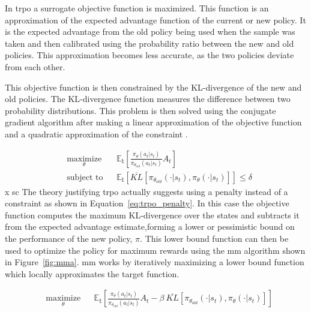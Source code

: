 In \acrshort{trpo} a surrogate objective function is maximized. This function is an approximation of the expected advantage function of the current or new policy. It is the expected advantage from the old policy being used when the sample was taken and then calibrated using the probability ratio between the new and old policies. This approximation becomes less accurate, as the two policies deviate from each other.

This objective function is then constrained by the KL-divergence of the new and old policies. The KL-divergence function measures the difference between two probability distributions. This problem is then solved using the conjugate gradient algorithm after making a linear approximation of the objective function and a quadratic approximation of the constraint \cite{schulman2015trust}.

\begin{equation}
  \begin{aligned}
  & \underset{\theta}{\text{maximize}}
  & & \mathbb{E_t} \left[\frac{\pi_\theta(a_t | s_t)}{\pi_{\theta_{old}}(a_t | s_t)} A_t\right] \\
  & \text{subject to}
  & & \mathbb{E_t}\left[\overline{KL}\left[ \pi_{\theta_{old}}(\cdot | s_t), \pi_\theta(
    \cdot | s_t) \right]\right] \leq \delta
  \end{aligned}
  \label{eq:trpo_constraint}
  \end{equation}
  x sc
The theory justifying \acrshort{trpo} actually suggests using a penalty instead of a constraint as shown in Equation~\ref{eq:trpo_penalty}. In this case the objective function computes the maximum KL-divergence over the states and subtracts it from the expected advantage estimate,forming a lower or pessimistic bound on the performance of the new policy, $\pi$. This lower bound function can then be used to optimize the policy for maximum rewards using the \acrfull{mm} algorithm shown in Figure~\ref{fig:mma}. \acrshort{mm} works by iteratively maximizing a lower bound function which locally approximates the target function.

\begin{equation}
  \begin{aligned}
  & \underset{\theta}{\text{maximize}}
  & & \mathbb{E_t} \left[
    \frac{\pi_\theta(a_t | s_t)}{\pi_{\theta_{old}}(a_t | s_t)} A_t
    - \beta\ \overline{KL}\left[ \pi_{\theta_{old}}(\cdot | s_t), \pi_\theta(\cdot | s_t) \right]
  \right]   
  \end{aligned}
  \label{eq:trpo_penalty}
  \end{equation}

